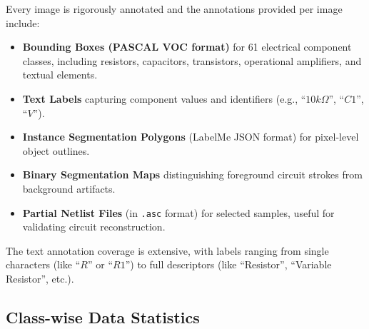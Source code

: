 Every image is rigorously annotated and the annotations provided per image include:

\begin{itemize}
    \item \textbf{Bounding Boxes (PASCAL VOC format)} for 61 electrical component classes, including resistors, capacitors, transistors, operational amplifiers, and textual elements.
    
    \item \textbf{Text Labels} capturing component values and identifiers (e.g., ``$10k\Omega$'', ``$C1$'', ``$V$'').
    
    \item \textbf{Instance Segmentation Polygons} (LabelMe JSON format) for pixel-level object outlines.
    
    \item \textbf{Binary Segmentation Maps} distinguishing foreground circuit strokes from background artifacts.
    
    \item \textbf{Partial Netlist Files} (in \texttt{.asc} format) for selected samples, useful for validating circuit reconstruction.
\end{itemize}

The text annotation coverage is extensive, with labels ranging from single characters (like ``$R$'' or ``$R1$'') to full descriptors (like ``Resistor'', ``Variable Resistor'', etc.).

\subsection{Class-wise Data Statistics}

